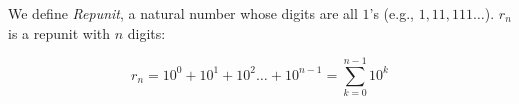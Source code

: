 We define \textit{Repunit}, a natural number
whose digits are all $1$'s (e.g., $1, 11, 111 \dots$).
$r_n$ is a repunit with $n$ digits:

\begin{equation*}
r_n = 10^0 + 10^1 + 10^2 \dots + 10^{n-1}
= \sum_{k=0}^{n-1}{10^k}
\end{equation*}
